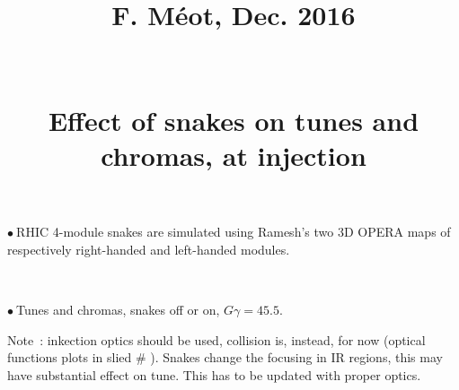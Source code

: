 \documentclass[10pt]{article}
\newcommand{\nib}{\noindent \ensuremath{\bullet~}}
\newcommand{\blue}{\color{blue}}
\newcommand{\referenceA}{\rm }
\newcommand{\referenceB}{\rm F. M\'eot, Dec. 2016}
\newcommand{\referenceC}{\rm }
\begin{document}
\landscape

\Large  \bf

\thispagestyle{myheadings}


\title{
  \hfill  \referenceA \\
 \hfill \referenceB  \\
 \hfill \referenceC  \\
~ ~ ~ \\
{\bf \blue
\Huge Effect of snakes on tunes and chromas, at injection
} 
}

\date{}

\pagestyle{headings}

\maketitle

\tableofcontents

 


\clearpage

\nib RHIC 4-module snakes are simulated using Ramesh's two 3D OPERA maps of respectively  
right-handed and  left-handed modules. 

~

\nib Tunes and chromas,  snakes off or on, $G\gamma = 45.5$. 

Note~: inkection optics should be used, collision is, instead, for now (optical functions 
plots in slied \# \pageref{slide:optics}). Snakes change the  focusing in IR regions, 
this may have substantial effect on tune. This has to be updated with proper optics.  

~

~
\end{document}

